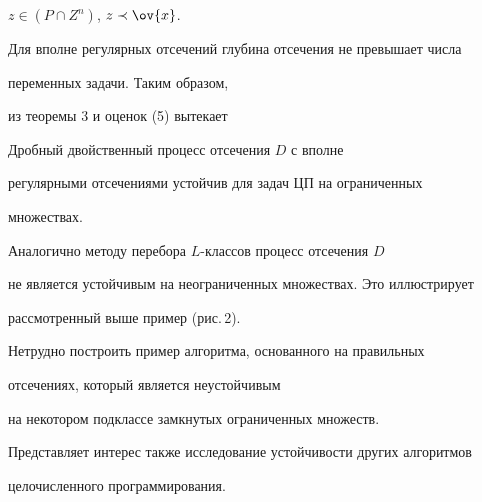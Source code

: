 $z \in (P \cap Z^{n})$, $z \prec \ov{x}$.








Для вполне регулярных отсечений глубина отсечения не превышает числа


переменных задачи. Таким образом, 


из теоремы 3 и оценок (5) вытекает 





\begin{cor}


Дробный двойственный процесс отсечения $D$ с вполне


регулярными отсечениями устойчив для задач ЦП на  ограниченных


множествах. 


\end{cor}





Аналогично методу перебора $L$-классов  процесс отсечения $D$


не является устойчивым на неограниченных множествах. Это иллюстрирует 


рассмотренный выше пример (рис.\,2).





Нетрудно построить пример алгоритма, основанного на правильных


отсечениях, который является неустойчивым 


на некотором подклассе замкнутых ограниченных множеств.


Представляет интерес также исследование устойчивости других алгоритмов


целочисленного программирования.











